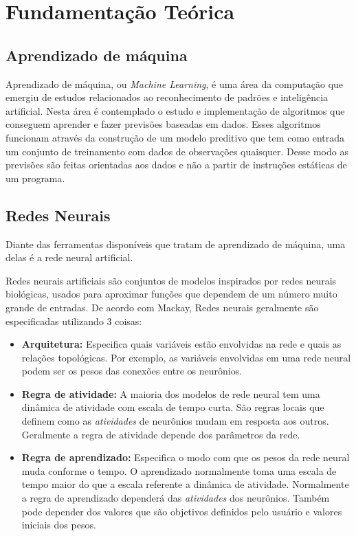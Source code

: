 \chapter{Fundamentação Teórica}

\section{Aprendizado de máquina}

Aprendizado de máquina, ou \textit{Machine Learning}, é uma área da
computação que emergiu de estudos relacionados ao reconhecimento de
padrões e inteligência artificial. Nesta área é contemplado o estudo e
implementação de algoritmos que conseguem aprender e fazer previsões
baseadas em dados. Esses algoritmos funcionam através da construção de
um modelo preditivo que tem como entrada um conjunto de treinamento
com dados de observações quaisquer. Desse modo as previsões são feitas
orientadas aos dados e não a partir de instruções estáticas de um
programa.

\section{Redes Neurais}

Diante das ferramentas disponíveis que tratam de aprendizado de
máquina, uma delas é a rede neural artificial.

Redes neurais artificiais são conjuntos de modelos inspirados por
redes neurais biológicas, usados para aproximar funções que dependem
de um número muito grande de entradas. De acordo com Mackay\cite{Mackay},
Redes neurais geralmente são especificadas utilizando 3 coisas:

\begin{itemize}

\item {\bf Arquitetura:} Especifica quais variáveis estão envolvidas
  na rede e quais as relações topológicas. Por exemplo, as variáveis
  envolvidas em uma rede neural podem ser os pesos das conexões entre
  os neurônios.

\item {\bf Regra de atividade:} A maioria dos modelos de rede neural
  tem uma dinâmica de atividade com escala de tempo curta. São regras
  locais que definem como as \textit{atividades} de neurônios mudam em
  resposta aos outros. Geralmente a regra de atividade depende dos
  parâmetros da rede.

\item {\bf Regra de aprendizado:} Especifica o modo com que os pesos
  da rede neural muda conforme o tempo. O aprendizado normalmente toma
  uma escala de tempo maior do que a escala referente a dinâmica de
  atividade. Normalmente a regra de aprendizado dependerá das
  \textit{atividades} dos neurônios. Também pode depender dos valores
  que são objetivos definidos pelo usuário e valores iniciais dos
  pesos.

\end{itemize}

